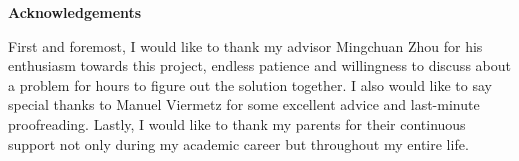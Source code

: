 


\vspace*{2cm}

\begin{center}
{\Large \textbf {Acknowledgements}}
\end{center}

\vspace{1cm}
First and foremost, I would like to thank my advisor Mingchuan Zhou for his enthusiasm towards this project, endless patience and  willingness to discuss about a problem for hours to figure out the solution together. I also would like to say special thanks to Manuel Viermetz for some excellent advice and last-minute proofreading. Lastly, I would like to thank my parents for their continuous support not only during my academic career but throughout my entire life. 